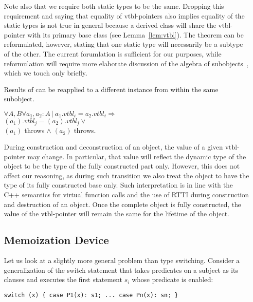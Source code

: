 Note also that we require both static types to be the same. Dropping this 
requirement and saying that equality of vtbl-pointers also implies equality of 
the static types is not true in general because a derived class will share the 
vtbl-pointer with its primary base class (see Lemma~\ref{lem:vtbl}). The theorem 
can be reformulated, however, stating that one static type will necessarily be a 
subtype of the other. The current forumlation is sufficient for our purposes, 
while reformulation will require more elaborate discussion of the algebra 
of subobjects~\cite{RDL11}, which we touch only briefly.

\begin{corollary}
Results of  can be reapplied to a different instance from 
within the same subobject. 

$\forall A,B \forall a_1, a_2 : A\ |\ a_1.vtbl_i = a_2.vtbl_i \Rightarrow$ \\
$(a_1).vtbl_j = $$(a_2).vtbl_j \vee$ \\
$(a_1)$ throws $\wedge$ $(a_2)$ throws.
\label{crl:vtbl}
\end{corollary}

\noindent
During construction and deconstruction of 
an object, the value of a given vtbl-pointer may change. In particular, 
that value will reflect the dynamic type of the object to be the type of the 
fully constructed part only. However, this does not affect our reasoning, as during 
such transition we also treat the object to have the type of its fully 
constructed base only. Such interpretation is in line with the C++ semantics for 
virtual function calls and the use of RTTI during construction and destruction of an 
object. Once the complete object is fully constructed, the value of the 
vtbl-pointer will remain the same for the lifetime of the object.

\subsection{Memoization Device}
\label{sec:memdev}

Let us look at a slightly more general problem than type switching. Consider a 
generalization of the switch statement that takes predicates on a subject as its 
clauses and executes the first statement $s_i$ whose predicate is enabled: 

\begin{lstlisting}[keepspaces]
switch (x) { case P1(x): s1; ... case Pn(x): sn; }
\end{lstlisting}

